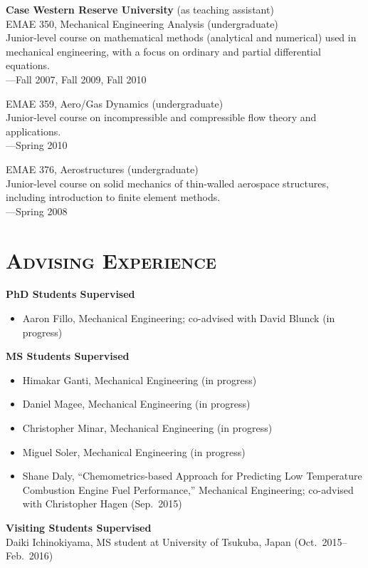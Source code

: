 \documentclass[margin,line,11pt]{res}
\begin{document}
\begin{resume}
\textbf{Case Western Reserve University} (as teaching assistant) \\
EMAE 350, Mechanical Engineering Analysis (undergraduate) \\
Junior-level course on mathematical methods (analytical and numerical) used in mechanical engineering, with a focus on ordinary and partial differential equations. \\
---Fall 2007, Fall 2009, Fall 2010

EMAE 359, Aero\slash Gas Dynamics (undergraduate) \\
Junior-level course on incompressible and compressible flow theory and applications. \\
---Spring 2010

EMAE 376, Aerostructures (undergraduate) \\
Junior-level course on solid mechanics of thin-walled aerospace structures, including introduction to finite element methods. \\
---Spring 2008

\section{\textsc{Advising Experience}}

\textbf{PhD Students Supervised}
\begin{itemize}[leftmargin=*]
\item Aaron Fillo, Mechanical Engineering; co-advised with David Blunck (in progress)
\end{itemize}

\textbf{MS Students Supervised}
\begin{itemize}[leftmargin=*]
\item Himakar Ganti, Mechanical Engineering (in progress)
\item Daniel Magee, Mechanical Engineering (in progress)
\item Christopher Minar, Mechanical Engineering (in progress)
\item Miguel Soler, Mechanical Engineering (in progress)
\item Shane Daly, ``Chemometrics-based Approach for Predicting Low Temperature Combustion Engine Fuel Performance,'' Mechanical Engineering; co-advised with Christopher Hagen (Sep.\ 2015)
\end{itemize}

\textbf{Visiting Students Supervised} \\
Daiki Ichinokiyama, MS student at University of Tsukuba, Japan (Oct.\ 2015--Feb.\ 2016)


\end{resume}
\end{document}
